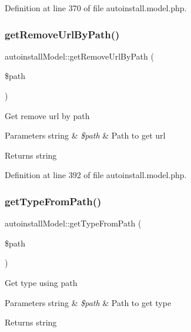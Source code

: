 Definition at line 370 of file autoinstall.\+model.\+php.

\hypertarget{classautoinstallModel_a40c61ad733cb70958d2c550f06abc15d}{}\label{classautoinstallModel_a40c61ad733cb70958d2c550f06abc15d} 
\subsubsection{\texorpdfstring{get\+Remove\+Url\+By\+Path()}{getRemoveUrlByPath()}}
{\footnotesize\ttfamily autoinstall\+Model\+::get\+Remove\+Url\+By\+Path (\begin{DoxyParamCaption}\item[{}]{\$path }\end{DoxyParamCaption})}

Get remove url by path


\begin{DoxyParams}[1]{Parameters}
string & {\em \$path} & Path to get url \\
\hline
\end{DoxyParams}
\begin{DoxyReturn}{Returns}
string 
\end{DoxyReturn}


Definition at line 392 of file autoinstall.\+model.\+php.

\hypertarget{classautoinstallModel_a29f5fd06b39d6df431d699efcb0aba47}{}\label{classautoinstallModel_a29f5fd06b39d6df431d699efcb0aba47} 
\subsubsection{\texorpdfstring{get\+Type\+From\+Path()}{getTypeFromPath()}}
{\footnotesize\ttfamily autoinstall\+Model\+::get\+Type\+From\+Path (\begin{DoxyParamCaption}\item[{}]{\$path }\end{DoxyParamCaption})}

Get type using path


\begin{DoxyParams}[1]{Parameters}
string & {\em \$path} & Path to get type \\
\hline
\end{DoxyParams}
\begin{DoxyReturn}{Returns}
string 
\end{DoxyReturn}


